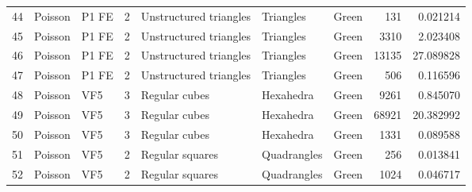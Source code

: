 \begin{tabular}{lllrlllrr}
44  &           Poisson &                          P1 FE &               2 &                    Unstructured triangles &              Triangles  &                                Green &                      131 &                         0.021214 \\
45  &           Poisson &                          P1 FE &               2 &                    Unstructured triangles &              Triangles  &                                Green &                     3310 &                         2.023408 \\
46  &           Poisson &                          P1 FE &               2 &                    Unstructured triangles &              Triangles  &                                Green &                    13135 &                        27.089828 \\
47  &           Poisson &                          P1 FE &               2 &                    Unstructured triangles &              Triangles  &                                Green &                      506 &                         0.116596 \\
48  &           Poisson &                            VF5 &               3 &                             Regular cubes &              Hexahedra  &                                Green &                     9261 &                         0.845070 \\
49  &           Poisson &                            VF5 &               3 &                             Regular cubes &              Hexahedra  &                                Green &                    68921 &                        20.382992 \\
50  &           Poisson &                            VF5 &               3 &                             Regular cubes &              Hexahedra  &                                Green &                     1331 &                         0.089588 \\
51  &           Poisson &                            VF5 &               2 &                           Regular squares &            Quadrangles  &                                Green &                      256 &                         0.013841 \\
52  &           Poisson &                            VF5 &               2 &                           Regular squares &            Quadrangles  &                                Green &                     1024 &                         0.046717 \\

\end{tabular}
